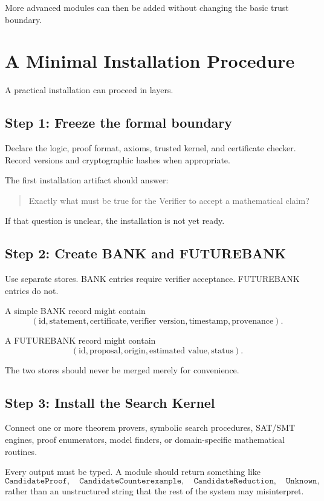 \documentclass[11pt]{article}
\begin{document}
More advanced modules can then be added without changing the basic trust boundary.

\section{A Minimal Installation Procedure}

A practical installation can proceed in layers.

\subsection{Step 1: Freeze the formal boundary}

Declare the logic, proof format, axioms, trusted kernel, and certificate checker. Record versions and cryptographic hashes when appropriate.

The first installation artifact should answer:
\begin{quote}
Exactly what must be true for the Verifier to accept a mathematical claim?
\end{quote}

If that question is unclear, the installation is not yet ready.

\subsection{Step 2: Create BANK and FUTUREBANK}

Use separate stores. BANK entries require verifier acceptance. FUTUREBANK entries do not.

A simple BANK record might contain
\[
(\text{id},\text{statement},\text{certificate},\text{verifier version},\text{timestamp},\text{provenance}).
\]

A FUTUREBANK record might contain
\[
(\text{id},\text{proposal},\text{origin},\text{estimated value},\text{status}).
\]

The two stores should never be merged merely for convenience.

\subsection{Step 3: Install the Search Kernel}

Connect one or more theorem provers, symbolic search procedures, SAT/SMT engines, proof enumerators, model finders, or domain-specific mathematical routines.

Every output must be typed. A module should return something like
\[
\texttt{CandidateProof},\quad
\texttt{CandidateCounterexample},\quad
\texttt{CandidateReduction},\quad
\texttt{Unknown},
\]
rather than an unstructured string that the rest of the system may misinterpret.
\end{document}

